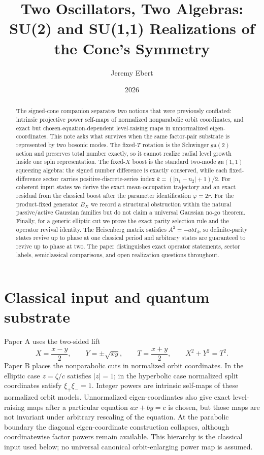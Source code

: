 \documentclass[11pt]{amsart}
\title[Two Algebras on the Cone]{Two Oscillators, Two Algebras: SU(2) and SU(1,1) Realizations of the Cone's Symmetry}
\author{Jeremy Ebert}
\date{2026}
\theoremstyle{remark}
\begin{document}
\maketitle

\begin{abstract}
The signed-cone companion \cite{Ebert2026EigenCoord} separates two notions that were previously conflated: intrinsic projective power self-maps of normalized nonparabolic orbit coordinates, and exact but chosen-equation-dependent level-raising maps in unnormalized eigen-coordinates.  This note asks what survives when the same factor-pair substrate is represented by two bosonic modes.  The fixed-$T$ rotation is the Schwinger $\mathfrak{su}(2)$ action and preserves total number exactly, so it cannot realize radial level growth inside one spin representation.  The fixed-$X$ boost is the standard two-mode $\mathfrak{su}(1,1)$ squeezing algebra: the signed number difference is exactly conserved, while each fixed-difference sector carries positive-discrete-series index $k=(|n_1-n_2|+1)/2$.  For coherent input states we derive the exact mean-occupation trajectory and an exact residual from the classical boost after the parameter identification $\varphi=2r$.  For the product-fixed generator $B_X$ we record a structural obstruction within the natural passive/active Gaussian families but do not claim a universal Gaussian no-go theorem.  Finally, for a generic elliptic cut we prove the exact parity selection rule and the operator revival identity.  The Heisenberg matrix satisfies $A^2=-abI_4$, so definite-parity states revive up to phase at one classical period and arbitrary states are guaranteed to revive up to phase at two.  The paper distinguishes exact operator statements, sector labels, semiclassical comparisons, and open realization questions throughout.
\end{abstract}

\section{Classical input and quantum substrate}
Paper A \cite{Ebert2026Table} uses the two-sided lift
\[
X=\frac{x-y}{2},\qquad Y=\pm\sqrt{xy},\qquad T=\frac{x+y}{2},\qquad X^2+Y^2=T^2.
\]
Paper B \cite{Ebert2026EigenCoord} places the nonparabolic cuts in normalized orbit coordinates.  In the elliptic case $z=\zeta/c$ satisfies $|z|=1$; in the hyperbolic case normalized split coordinates satisfy $\xi_+\xi_-=1$.  Integer powers are intrinsic self-maps of these normalized orbit models.  Unnormalized eigen-coordinates also give exact level-raising maps after a particular equation $ax+by=c$ is chosen, but those maps are not invariant under arbitrary rescaling of the equation.  At the parabolic boundary the diagonal eigen-coordinate construction collapses, although coordinatewise factor powers remain available.  This hierarchy is the classical input used below; no universal canonical orbit-enlarging power map is assumed.
\end{document}
